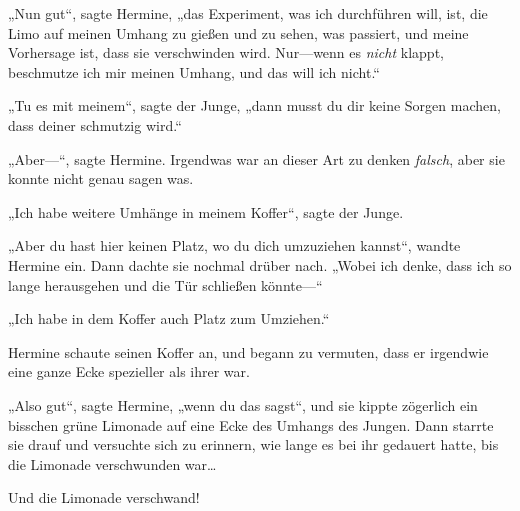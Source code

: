 „Nun gut“, sagte Hermine, „das Experiment, was ich durchführen will, ist, die Limo auf meinen Umhang zu gießen und zu sehen, was passiert, und meine Vorhersage ist, dass sie verschwinden wird. Nur—wenn es \emph{nicht} klappt, beschmutze ich mir meinen Umhang, und das will ich nicht.“

„Tu es mit meinem“, sagte der Junge, „dann musst du dir keine Sorgen machen, dass deiner schmutzig wird.“

„Aber—“, sagte Hermine. Irgendwas war an dieser Art zu denken \emph{falsch}, aber sie konnte nicht genau sagen was.

„Ich habe weitere Umhänge in meinem Koffer“, sagte der Junge.

„Aber du hast hier keinen Platz, wo du dich umzuziehen kannst“, wandte Hermine ein. Dann dachte sie nochmal drüber nach. „Wobei ich denke, dass ich so lange herausgehen und die Tür schließen könnte—“

„Ich habe in dem Koffer auch Platz zum Umziehen.“

Hermine schaute seinen Koffer an, und begann zu vermuten, dass er irgendwie eine ganze Ecke spezieller als ihrer war.

„Also gut“, sagte Hermine, „wenn du das sagst“, und sie kippte zögerlich ein bisschen grüne Limonade auf eine Ecke des Umhangs des Jungen. Dann starrte sie drauf und versuchte sich zu erinnern, wie lange es bei ihr gedauert hatte, bis die Limonade verschwunden war…

Und die Limonade verschwand!

